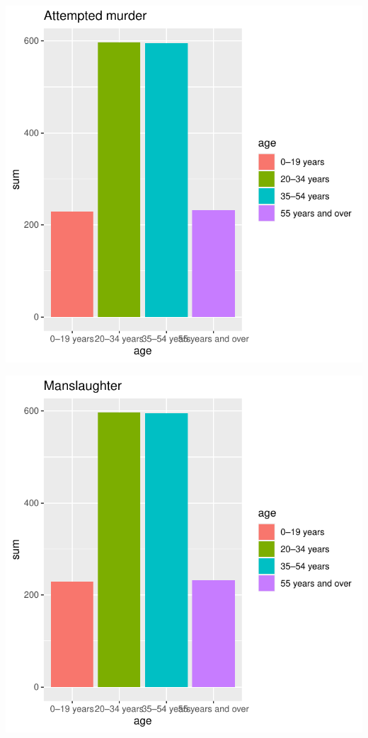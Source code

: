 \documentclass[11pt,a4paper,]{article}
\begin{document}
\includegraphics{report_files/figure-latex/attplot-1.pdf}

\includegraphics{report_files/figure-latex/manplot-1.pdf}
\end{document}
